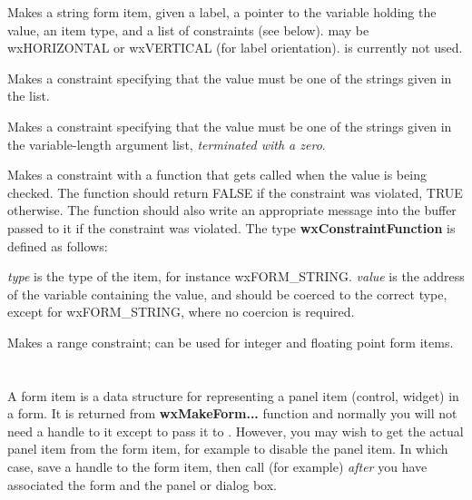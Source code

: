 Makes a string form item, given a label, a pointer to the variable
holding the value, an item type, and a list of constraints (see below).
 may be wxHORIZONTAL or wxVERTICAL (for label orientation).
 is currently not used.


Makes a constraint specifying that the value must be one of the strings
given in the list.


Makes a constraint specifying that the value must be one of the strings
given in the variable-length argument list, {\it terminated with a zero}.


Makes a constraint with a function that gets called when the value is
being checked. The function should return FALSE if the constraint was
violated, TRUE otherwise.  The function should also write an appropriate
message into the buffer passed to it if the constraint was violated.
The type {\bf wxConstraintFunction} is defined as follows:


{\it type} is the type of the item, for instance wxFORM\_STRING. {\it value} is
the address of the variable containing the value, and should be coerced
to the correct type, except for wxFORM\_STRING, where no coercion is required.


Makes a range constraint; can be used for integer and floating point
form items.

\section{}\label{wxformitem}

A form item is a data structure for representing a panel item (control, widget) in a form.
It is returned from {\bf wxMakeForm...} function and normally you will not need a handle
to it except to pass it to . However, you may wish
to get the actual panel item from the form item, for example to disable the panel item.
In which case, save a handle to the form item, then call (for
example)  {\it after} you
have associated the form and the panel or dialog box.

